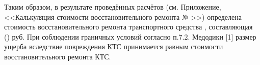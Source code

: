 %

\par
Таким образом, в результате проведённых расчётов (см. Приложение, <<Калькуляция стоимости восстановительного ремонта № \NomerDoc>>) определена стоимость восстановительного ремонта транспортного средства  , составляющая  \, () руб. %
При соблюдении граничных условий согласно п.7.2. Медодики [1] размер ущерба вследствие повреждения КТС принимается равным стоимости восстановительного ремонта КТС.
%




